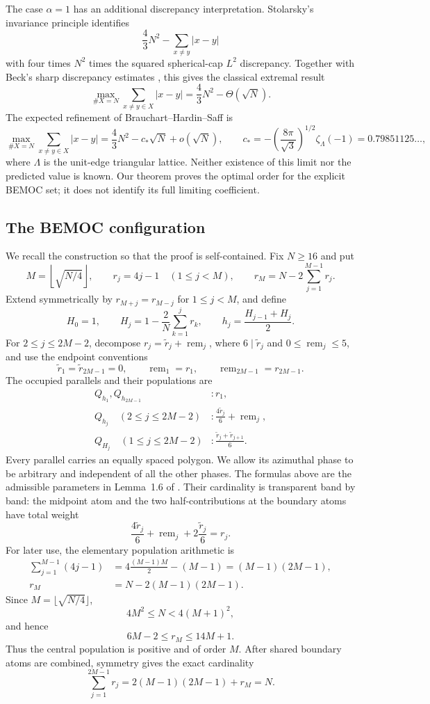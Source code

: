 \documentclass[11pt]{amsart}
\begin{document}
The case $\alpha=1$ has an additional discrepancy interpretation.
Stolarsky's invariance principle \cite{Stolarsky} identifies
\[
 \frac43N^2-\sum_{x\ne y}|x-y|
\]
with four times $N^2$ times the squared spherical-cap $L^2$ discrepancy.
Together with Beck's sharp discrepancy estimates \cite{Beck}, this gives the classical
extremal result
\[
 \max_{\#X=N}\sum_{x\ne y\in X}|x-y|
 =\frac43N^2-\Theta(\sqrt N).
\]
The expected refinement of Brauchart--Hardin--Saff is
\[
 \max_{\#X=N}\sum_{x\ne y\in X}|x-y|
 =\frac43N^2-c_*\sqrt N+o(\sqrt N),
 \qquad
 c_*=-\left(\frac{8\pi}{\sqrt3}\right)^{1/2}
 \zeta_\Lambda(-1)=0.79851125\ldots,
\]
where $\Lambda$ is the unit-edge triangular lattice.  Neither existence of
this limit nor the predicted value is known.  Our theorem proves the optimal
order for the explicit BEMOC set; it does not identify its full limiting
coefficient.

\subsection{The BEMOC configuration}

We recall the construction so that the proof is self-contained.  Fix
$N\ge16$ and put
\[
 M=\left\lfloor\sqrt{N/4}\right\rfloor,\qquad
 r_j=4j-1\quad(1\le j<M),\qquad
 r_M=N-2\sum_{j=1}^{M-1}r_j .
\]
Extend symmetrically by $r_{M+j}=r_{M-j}$ for $1\le j<M$, and define
\[
 H_0=1,\qquad H_j=1-\frac2N\sum_{k=1}^jr_k,\qquad
 h_j=\frac{H_{j-1}+H_j}{2}.
\]
For $2\le j\le2M-2$, decompose
$r_j=\widetilde r_j+\operatorname{rem}_j$, where
$6\mid\widetilde r_j$ and $0\le\operatorname{rem}_j\le5$, and use the
endpoint conventions
\[
 \widetilde r_1=\widetilde r_{2M-1}=0,
 \qquad \operatorname{rem}_1=r_1,
 \qquad \operatorname{rem}_{2M-1}=r_{2M-1}.
\]
The occupied
parallels and their populations are
\begin{align*}
 Q_{h_1},Q_{h_{2M-1}} &: r_1,\\
 Q_{h_j}\quad(2\le j\le2M-2)&:
 \frac{4\widetilde r_j}{6}+\operatorname{rem}_j,\\
 Q_{H_j}\quad(1\le j\le2M-2)&:
 \frac{\widetilde r_j+\widetilde r_{j+1}}6.
\end{align*}
Every parallel carries an equally spaced polygon.  We allow its azimuthal
phase to be arbitrary and independent of all the other phases.  The formulas
above are the admissible parameters in Lemma~1.6 of \cite{BEMOC}.
Their cardinality is transparent band by band: the midpoint atom and the
two half-contributions at the boundary atoms have total weight
\[
 \frac{4\widetilde r_j}{6}+\operatorname{rem}_j
 +2\frac{\widetilde r_j}{6}=r_j.
\]
For later use, the elementary population arithmetic is
\begin{align*}
 \sum_{j=1}^{M-1}(4j-1)
 &=4\frac{(M-1)M}{2}-(M-1)
   =(M-1)(2M-1),\\
 r_M&=N-2(M-1)(2M-1).
\end{align*}
Since $M=\lfloor\sqrt{N/4}\rfloor$,
\[
 4M^2\le N<4(M+1)^2,
\]
and hence
\[
 6M-2\le r_M\le14M+1.
\]
Thus the central population is positive and of order $M$.  After shared
boundary atoms are combined, symmetry gives the exact cardinality
\[
 \sum_{j=1}^{2M-1}r_j
 =2(M-1)(2M-1)+r_M=N.
\]
\end{document}
